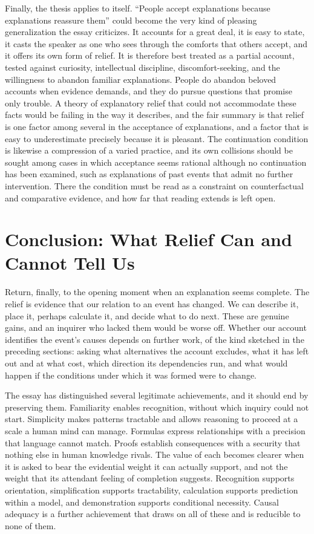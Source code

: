 \documentclass[11pt,letterpaper]{article}
\theoremstyle{definition}
\begin{document}
Finally, the thesis applies to itself. ``People accept explanations because explanations reassure them'' could become the very kind of pleasing generalization the essay criticizes. It accounts for a great deal, it is easy to state, it casts the speaker as one who sees through the comforts that others accept, and it offers its own form of relief. It is therefore best treated as a partial account, tested against curiosity, intellectual discipline, discomfort-seeking, and the willingness to abandon familiar explanations. People do abandon beloved accounts when evidence demands, and they do pursue questions that promise only trouble. A theory of explanatory relief that could not accommodate these facts would be failing in the way it describes, and the fair summary is that relief is one factor among several in the acceptance of explanations, and a factor that is easy to underestimate precisely because it is pleasant. The continuation condition is likewise a compression of a varied practice, and its own collisions should be sought among cases in which acceptance seems rational although no continuation has been examined, such as explanations of past events that admit no further intervention. There the condition must be read as a constraint on counterfactual and comparative evidence, and how far that reading extends is left open.

\section{Conclusion: What Relief Can and Cannot Tell Us}

Return, finally, to the opening moment when an explanation seems complete. The relief is evidence that our relation to an event has changed. We can describe it, place it, perhaps calculate it, and decide what to do next. These are genuine gains, and an inquirer who lacked them would be worse off. Whether our account identifies the event's causes depends on further work, of the kind sketched in the preceding sections: asking what alternatives the account excludes, what it has left out and at what cost, which direction its dependencies run, and what would happen if the conditions under which it was formed were to change.

The essay has distinguished several legitimate achievements, and it should end by preserving them. Familiarity enables recognition, without which inquiry could not start. Simplicity makes patterns tractable and allows reasoning to proceed at a scale a human mind can manage. Formulas express relationships with a precision that language cannot match. Proofs establish consequences with a security that nothing else in human knowledge rivals. The value of each becomes clearer when it is asked to bear the evidential weight it can actually support, and not the weight that its attendant feeling of completion suggests. Recognition supports orientation, simplification supports tractability, calculation supports prediction within a model, and demonstration supports conditional necessity. Causal adequacy is a further achievement that draws on all of these and is reducible to none of them.
\end{document}
